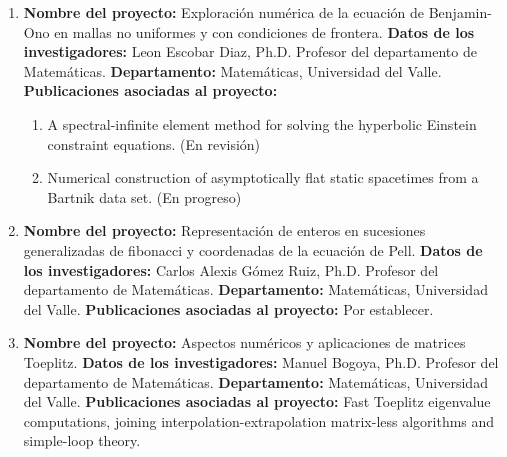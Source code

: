 \begin{spacing}{1.5}
\begin{enumerate}
    \item \textbf{Nombre del proyecto:} Exploración numérica de la ecuación
          de Benjamin-Ono en mallas no uniformes y con condiciones de frontera. \newline
          \textbf{Datos de los investigadores:} \newline
          Leon Escobar Diaz, Ph.D. Profesor del departamento de Matemáticas.
          \newline
          \textbf{Departamento: } Matemáticas, Universidad del Valle. \newline
          \textbf{Publicaciones asociadas al proyecto: } \begin{enumerate}
            \item A spectral-infinite element method for solving the hyperbolic
                  Einstein constraint equations. (En revisión)
            \item Numerical construction of asymptotically flat static
                  spacetimes from a Bartnik data set. (En progreso)
          \end{enumerate}

    \item \textbf{Nombre del proyecto:} Representación de enteros en
          sucesiones generalizadas de fibonacci y coordenadas de la ecuación de Pell.
          \newline
          \textbf{Datos de los investigadores:} \newline
          Carlos Alexis Gómez Ruiz, Ph.D. Profesor del departamento de
          Matemáticas. \newline
          \textbf{Departamento: } Matemáticas, Universidad del Valle. \newline
          \textbf{Publicaciones asociadas al proyecto: } \newline Por establecer.

    \item \textbf{Nombre del proyecto:} Aspectos numéricos y aplicaciones
          de matrices Toeplitz. \newline
          \textbf{Datos de los investigadores:} \newline
          Manuel Bogoya, Ph.D. Profesor del departamento de Matemáticas.\newline
          \textbf{Departamento: } Matemáticas, Universidad del Valle. \newline
          \textbf{Publicaciones asociadas al proyecto: } \newline Fast Toeplitz
          eigenvalue computations, joining interpolation-extrapolation matrix-less
          algorithms and simple-loop theory. \cite{Proy4}


\end{enumerate}
\end{spacing}
